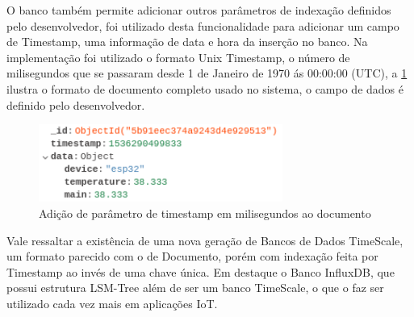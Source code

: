 O banco também permite adicionar outros parâmetros de indexação definidos pelo desenvolvedor, foi utilizado desta funcionalidade para adicionar um campo de Timestamp, uma informação de data e hora da inserção no banco. Na implementação foi utilizado o formato Unix Timestamp, o número de milisegundos que se passaram desde 1 de Janeiro de 1970 ás 00:00:00 (UTC), a \ref{fig:document-timestamp} ilustra o formato de documento completo usado no sistema, o campo de dados é definido pelo desenvolvedor. 

\begin{figure}[h!]
\centering
\includegraphics[width=8cm]{./02_Capitulos/02_Cap3/figures/document-timestamp}
\caption{Adição de parâmetro de timestamp em milisegundos ao documento}
\label{fig:document-timestamp}
\end{figure}

Vale ressaltar a existência de uma nova geração de Bancos de Dados TimeScale, um formato parecido com o de Documento, porém com indexação feita por Timestamp ao invés de uma chave única. Em destaque o Banco InfluxDB, que possui estrutura LSM-Tree além de ser um banco TimeScale, o que o faz ser utilizado cada vez mais em aplicações IoT.